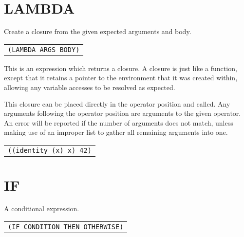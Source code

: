 \documentclass[
letterpaper,
oneside,
]{memoir}
\begin{document}
\vspace{1em}

\section{LAMBDA}

\noindent
Create a closure from the given expected arguments and body.

\begin{center}
  \begin{tabular}{c}
    \texttt{(LAMBDA ARGS BODY)}
  \end{tabular}
\end{center}

\noindent
This is an expression which returns a closure. A closure is just like a function, except that it retains a pointer to the environment that it was created within, allowing any variable accesses to be resolved as expected.

\noindent
This closure can be placed directly in the operator position and called. Any arguments following the operator position are arguments to the given operator. An error will be reported if the number of arguments does not match, unless making use of an improper list to gather all remaining arguments into one.

\begin{center}
  \begin{tabular}{c}
    \texttt{((identity (x) x) 42)}
  \end{tabular}
\end{center}

\vspace{1em}

\section{IF}

\noindent
A conditional expression.

\begin{center}
  \begin{tabular}{c}
    \texttt{(IF CONDITION THEN OTHERWISE)}
  \end{tabular}
\end{center}
\end{document}
